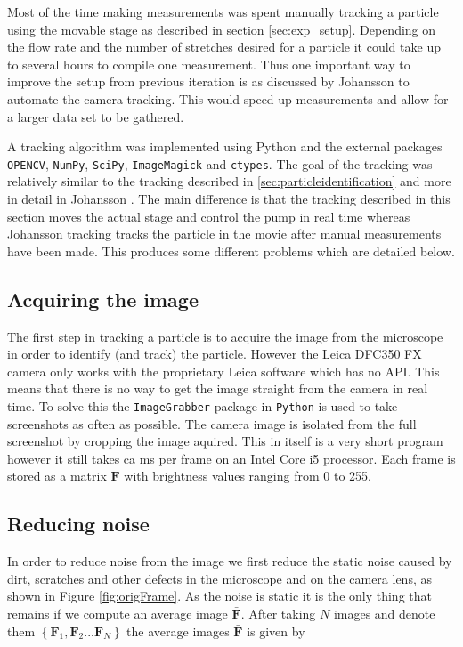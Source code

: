 %
%
%
%
%

Most of the time making measurements was spent manually tracking a particle using the movable stage as described in section \ref{sec:exp_setup}. Depending on the flow rate and the number of stretches desired for a particle it could take up to several hours to compile one measurement. Thus one important way to improve the setup from previous iteration is as discussed by Johansson \cite{AntonThesis} to automate the camera tracking. This would speed up measurements and allow for a larger data set to be gathered. 

A tracking algorithm was implemented using Python and the external packages \texttt{OPENCV}, \texttt{NumPy}, \texttt{SciPy}, \texttt{ImageMagick} and \texttt{ctypes}. The goal of the tracking was relatively similar to the tracking described in \ref{sec:particleidentification} and more in detail in Johansson \cite{AntonThesis}. The main difference is that the tracking described in this section moves the actual stage and control the pump in real time whereas Johansson tracking tracks the particle in the movie after manual measurements have been made. This produces some different problems which are detailed below. 

\subsection{Acquiring the image}
The first step in tracking a particle is to acquire the image from the microscope in order to identify (and track) the particle. However the Leica DFC350 FX camera only works with the proprietary Leica software which has no API. This means that there is no way to get the image straight from the camera in real time. To solve this the \texttt{ImageGrabber} package in \texttt{Python} is used to take screenshots as often as possible. The camera image is isolated from the full screenshot by cropping the image aquired. This in itself is a very short program however it still takes ca \unit[50]{ms} per frame on an Intel Core i5 processor. Each frame is stored as a matrix $\mathbf{F}$ with brightness values ranging from 0 to 255.

\subsection{Reducing noise}
In order to reduce noise from the image we first reduce the static noise caused by dirt, scratches and other defects in the microscope and on the camera lens, as shown in Figure \ref{fig:origFrame}. As the noise is static it is the only thing that remains if we compute an average image $\bar{\mathbf{F}}$. After taking $N$ images and denote them $\left\{\mathbf{F}_1,\mathbf{F}_2 ... \mathbf{F}_N \right\}$ the average images $\bar{\mathbf{F}}$ is given by 

